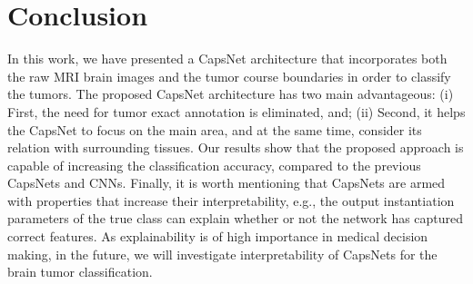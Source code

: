 \documentclass{article}
\begin{document}
\section{Conclusion}  \label{sec:con}
In this work, we have presented a CapsNet architecture that incorporates both the raw MRI brain images and the tumor course boundaries in order to classify the tumors. The proposed CapsNet architecture has two main advantageous: (i) First, the need for tumor exact annotation is eliminated, and; (ii) Second, it helps the CapsNet to focus on the main area, and at the same time, consider its relation with surrounding tissues. Our results show that the proposed approach is capable of increasing the classification accuracy, compared to the previous CapsNets and CNNs. Finally, it is worth mentioning that CapsNets are armed with properties that increase their interpretability, e.g.,  the output instantiation parameters of the true class can explain whether or not the network has captured correct features. As explainability is of high importance in medical decision making, in the future, we will investigate interpretability of CapsNets for the brain tumor classification.
\end{document}
